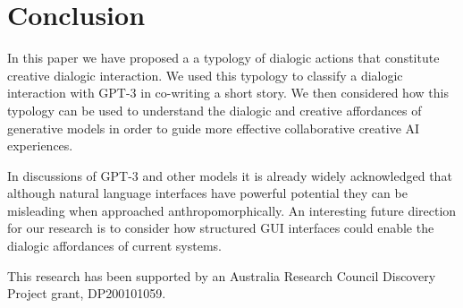 \documentclass[acmlarge, nonacm, screen]{acmart} %
\begin{document}
\section{Conclusion}

In this paper we have proposed a a typology of dialogic actions that constitute creative dialogic interaction. We used this typology to classify a dialogic interaction with GPT-3 in co-writing a short story. We then considered how this typology can be used to understand the dialogic and creative affordances of generative models in order to guide more effective collaborative creative AI experiences.

In discussions of GPT-3 and other models it is already widely acknowledged that although natural language interfaces have powerful potential they can be misleading when approached anthropomorphically. An interesting future direction for our research is to consider how structured GUI interfaces could enable the dialogic affordances of current systems. 


\begin{acks}
This research has been supported by an Australia Research Council Discovery Project grant, DP200101059.
\end{acks}



\end{document}
